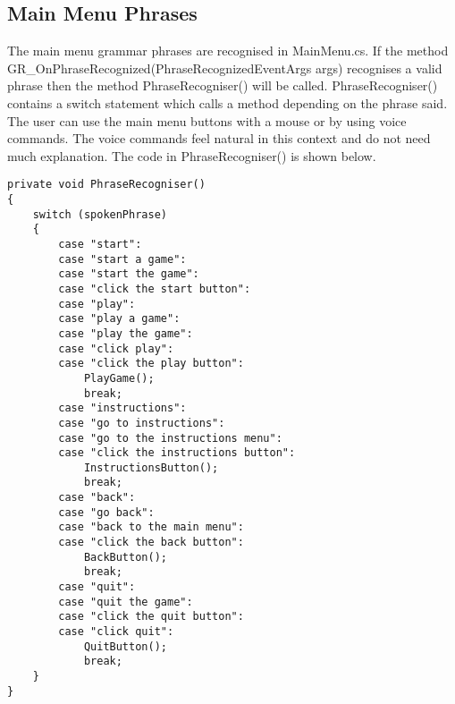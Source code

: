 \documentclass{article}
\begin{document}
\subsection{Main Menu Phrases}
The main menu grammar phrases are recognised in MainMenu.cs. If the method GR\_OnPhraseRecognized(PhraseRecognizedEventArgs args) recognises a valid phrase then the method PhraseRecogniser() will be called. PhraseRecogniser() contains a switch statement which calls a method depending on the phrase said. The user can use the main menu buttons with a mouse or by using voice commands. The voice commands feel natural in this context and do not need much explanation. The code in PhraseRecogniser() is shown below.
\begin{verbatim}
private void PhraseRecogniser()
{
    switch (spokenPhrase)
    {
        case "start":
        case "start a game":
        case "start the game":
        case "click the start button":
        case "play":
        case "play a game":
        case "play the game":
        case "click play":
        case "click the play button":
            PlayGame();
            break;
        case "instructions":
        case "go to instructions":
        case "go to the instructions menu":
        case "click the instructions button":
            InstructionsButton();
            break;
        case "back":
        case "go back":
        case "back to the main menu":
        case "click the back button":
            BackButton();
            break;
        case "quit":
        case "quit the game":
        case "click the quit button":
        case "click quit":
            QuitButton();
            break;
    }
}
\end{verbatim}
\end{document}
